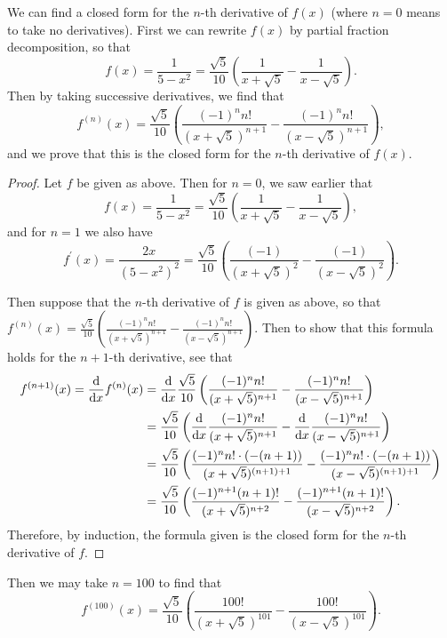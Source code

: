 \documentclass[11pt]{article}
\begin{document}
We can find a closed form for the $n$-th derivative of $f(x)$ (where $n = 0$ means to take no derivatives). First we can rewrite $f(x)$ by partial fraction decomposition, so that 
\[f(x) = \frac{1}{5-x^2} = \frac{\sqrt{5}}{10}\left(\frac{1}{x+\sqrt{5}} -\frac{1}{x-\sqrt{5}}\right).\] Then by taking successive derivatives, we find that 
\[f^{(n)}(x) = \frac{\sqrt{5}}{10}\left(\frac{(-1)^nn!}{(x+\sqrt{5})^{n+1}} -\frac{(-1)^nn!}{(x-\sqrt{5})^{n+1}}\right),\] and we prove that this is the closed form for the $n$-th derivative of $f(x)$.
\begin{proof}
    Let $f$ be given as above. Then for $n = 0$, we saw earlier that 
    \[f(x) = \frac{1}{5-x^2} = \frac{\sqrt{5}}{10}\left(\frac{1}{x+\sqrt{5}} -\frac{1}{x-\sqrt{5}}\right),\] and for $n=1$ we also have 
    \[f^{\prime}(x) = \frac{2x}{(5-x^2)^2} = \frac{\sqrt{5}}{10}\left(\frac{(-1)}{(x+\sqrt{5})^2} -\frac{(-1)}{(x-\sqrt{5})^2}\right).\]

    Then suppose that the $n$-th derivative of $f$ is given as above, so that $f^{(n)}(x) = \frac{\sqrt{5}}{10}\left(\frac{(-1)^nn!}{(x+\sqrt{5})^{n+1}} -\frac{(-1)^nn!}{(x-\sqrt{5})^{n+1}}\right)$. Then to show that this formula holds for the $n+1$-th derivative, see that \begin{align*}
        f^{(n+1)}(x) = \dv{x}f^{(n)}(x) &= \dv{x} \frac{\sqrt{5}}{10}\left(\frac{(-1)^nn!}{(x+\sqrt{5})^{n+1}} -\frac{(-1)^nn!}{(x-\sqrt{5})^{n+1}}\right)\\
        &= \frac{\sqrt{5}}{10}\left(\dv{x}\frac{(-1)^nn!}{(x+\sqrt{5})^{n+1}} -\dv{x}\frac{(-1)^nn!}{(x-\sqrt{5})^{n+1}}\right)\\
        &= \frac{\sqrt{5}}{10}\left(\frac{(-1)^nn!\cdot (-(n+1))}{(x+\sqrt{5})^{(n+1)+1}} - \frac{(-1)^nn!\cdot (-(n+1))}{(x-\sqrt{5})^{(n+1)+1}}\right)\\
        &= \frac{\sqrt{5}}{10}\left(\frac{(-1)^{n+1}(n+1)!}{(x+\sqrt{5})^{n+2}} -\frac{(-1)^{n+1}(n+1)!}{(x-\sqrt{5})^{n+2}}\right).
    \end{align*}
    Therefore, by induction, the formula given is the closed form for the $n$-th derivative of $f$.
\end{proof}

Then we may take $n=100$ to find that \[f^{(100)}(x) = \frac{\sqrt{5}}{10}\left(\frac{100!}{(x+\sqrt{5})^{101}} -\frac{100!}{(x-\sqrt{5})^{101}}\right).\]
\end{document}
